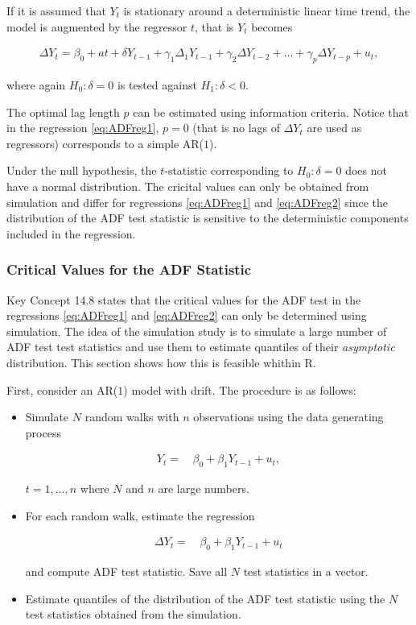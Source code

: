 \documentclass[]{book}
\theoremstyle{definition}
\theoremstyle{definition}
\theoremstyle{definition}
\theoremstyle{remark}
\begin{document}
If it is assumed that \(Y_t\) is stationary around a deterministic
linear time trend, the model is augmented by the regressor \(t\), that
is \(Y_t\) becomes

\begin{align}
  \Delta Y_t = \beta_0 + at + \delta Y_{t-1} + \gamma_1 \Delta_1 Y_{t-1} + \gamma_2 \Delta Y_{t-2} + \dots + \gamma_p \Delta Y_{t-p} + u_t,  \label{eq:ADFreg2}
\end{align}

where again \(H_0: \delta = 0\) is tested against \(H_1: \delta < 0\).

The optimal lag length \(p\) can be estimated using information
criteria. Notice that in the regression \eqref{eq:ADFreg1}, \(p=0\) (that
is no lags of \(\Delta Y_t\) are used as regressors) corresponds to a
simple AR(\(1\)).

Under the null hypothesis, the \(t\)-statistic corresponding to
\(H_0: \delta = 0\) does not have a normal distribution. The cricital
values can only be obtained from simulation and differ for regressions
\eqref{eq:ADFreg1} and \eqref{eq:ADFreg2} since the distribution of the ADF
test statistic is sensitive to the deterministic components included in
the regression.

\subsubsection*{Critical Values for the ADF
Statistic}\label{critical-values-for-the-adf-statistic}

Key Concept 14.8 states that the critical values for the ADF test in the
regressions \eqref{eq:ADFreg1} and \eqref{eq:ADFreg2} can only be determined
using simulation. The idea of the simulation study is to simulate a
large number of ADF test test statistics and use them to estimate
quantiles of their \emph{asymptotic} distribution. This section shows
how this is feasible whithin R.

First, consider an AR(\(1\)) model with drift. The procedure is as
follows:

\begin{itemize}
\item
  Simulate \(N\) random walks with \(n\) observations using the data
  generating process

  \begin{align*}
    Y_t =& \, \beta_0 + \beta_1 Y_{t-1} + u_t,
  \end{align*}

  \(t=1,\dots,n\) where \(N\) and \(n\) are large numbers.
\item
  For each random walk, estimate the regression

  \begin{align*}
    \Delta Y_t =& \, \beta_0 + \beta_1 Y_{t-1} + u_t
  \end{align*}

  and compute ADF test statistic. Save all \(N\) test statistics in a
  vector.
\item
  Estimate quantiles of the distribution of the ADF test statistic using
  the \(N\) test statistics obtained from the simulation.
\end{itemize}
\end{document}
